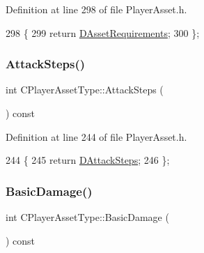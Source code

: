 Definition at line 298 of file Player\+Asset.\+h.


\begin{DoxyCode}
298                                                          \{
299             \textcolor{keywordflow}{return} \hyperlink{classCPlayerAssetType_a76d89bd6479ac30a0452d0a8aaf731c5}{DAssetRequirements};
300         \};
\end{DoxyCode}
\hypertarget{classCPlayerAssetType_a34306f4689aaa073ac0f28c10dda57d0}{}\label{classCPlayerAssetType_a34306f4689aaa073ac0f28c10dda57d0} 
\subsubsection{\texorpdfstring{Attack\+Steps()}{AttackSteps()}}
{\footnotesize\ttfamily int C\+Player\+Asset\+Type\+::\+Attack\+Steps (\begin{DoxyParamCaption}{ }\end{DoxyParamCaption}) const\hspace{0.3cm}{\ttfamily [inline]}}



Definition at line 244 of file Player\+Asset.\+h.


\begin{DoxyCode}
244                                \{
245             \textcolor{keywordflow}{return} \hyperlink{classCPlayerAssetType_af2a95fbee4ed2ac1ff1da0f649966a6d}{DAttackSteps};  
246         \};
\end{DoxyCode}
\hypertarget{classCPlayerAssetType_add63aee5f0b58f91d67a136da9ae318d}{}\label{classCPlayerAssetType_add63aee5f0b58f91d67a136da9ae318d} 
\subsubsection{\texorpdfstring{Basic\+Damage()}{BasicDamage()}}
{\footnotesize\ttfamily int C\+Player\+Asset\+Type\+::\+Basic\+Damage (\begin{DoxyParamCaption}{ }\end{DoxyParamCaption}) const\hspace{0.3cm}{\ttfamily [inline]}}



